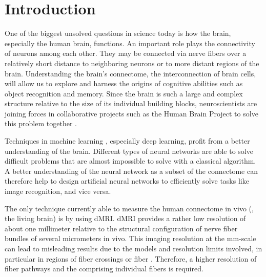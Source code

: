 \newpage\null\thispagestyle{empty}\newpage
\clearpage{\thispagestyle{empty}\cleardoublepage}
\cleardoublepage
%
%
%
\setcounter{chapter}{0}
\chapter{Introduction}
\label{sec:intro}
%
One of the biggest unsolved questions in science today is how the brain, especially the human brain, functions.
An important role plays the connectivity of neurons among each other.
They may be connected via nerve fibers over a relatively short distance to neighboring neurons or to more distant regions of the brain.
Understanding the brain's connectome, the interconnection of brain cells, will allow us to explore and harness the origins of cognitive abilities such as object recognition and memory.
Since the brain is such a large and complex structure relative to the size of its individual building blocks, neuroscientists are joining forces in collaborative projects such as the Human Brain Project to solve this problem together \cite{Markram2006, Shen2012, Amunts2013, Amunts2016}.
\par
%
Techniques in machine learning \cite{murphy2013machine, Goodfellow-et-al-2016}, especially deep learning, profit from a better understanding of the brain.
Different types of neural networks are able to solve difficult problems that are almost impossible to solve with a classical algorithm.
A better understanding of the neural network as a subset of the connectome can therefore help to design artificial neural networks to efficiently solve tasks like image recognition, and vice versa.
\par
%
The only technique currently able to measure the human connectome in vivo (\ie{}, the living brain) is by using \ac{dMRI}.
\ac{dMRI} provides a rather low resolution of about one millimeter relative to the structural configuration of nerve fiber bundles of several micrometers in vivo.
This imaging resolution at the \si{\milli\meter}-scale can lead to misleading results due to the models and resolution limits involved, in particular in regions of fiber crossings or fiber  \cite{MaierHein2017, Schilling2021}.
Therefore, a higher resolution of fiber pathways and the comprising individual fibers is required.
